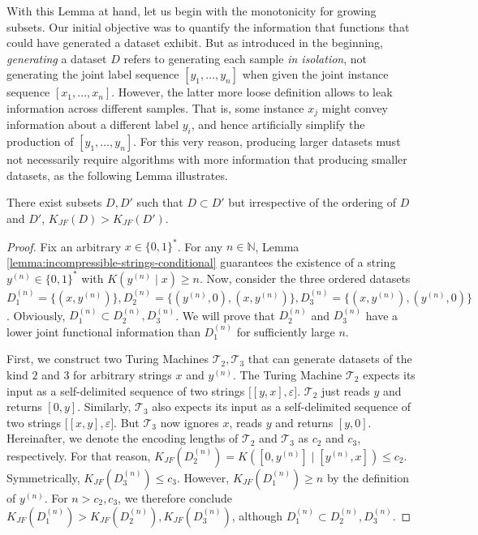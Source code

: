 With this Lemma at hand, let us begin with the monotonicity for growing subsets.
Our initial objective was to quantify the information that functions that could have generated a dataset exhibit.
But as introduced in the beginning, \textit{generating} a dataset $D$ refers to generating each sample \textit{in isolation}, not generating the joint label sequence $[y_1,\dots,y_n]$ when given the joint instance sequence $[x_1,\dots,x_n]$.
However, the latter more loose definition allows to leak information across different samples.
That is, some instance $x_j$ might convey information about a different label $y_i$, and hence artificially simplify the production of $[y_1,\dots,y_n]$.
For this very reason, producing larger datasets must not necessarily require algorithms with more information that producing smaller datasets, as the following Lemma illustrates.
\begin{lemma}
	There exist subsets $D,D'$ such that $D\subset D'$ but irrespective of the ordering of $D$ and $D'$, $K_{JF}(D)>K_{JF}(D')$.
\end{lemma}
\begin{proof}
	Fix an arbitrary $x\in\{0,1\}^{*}$.
	For any $n\in\mathbb{N}$, Lemma \ref{lemma:incompressible-strings-conditional} guarantees the existence of a string $y^{(n)}\in\{0,1\}^{*}$ with $K(y^{(n)}\mid x)\geq n$.
	Now, consider the three ordered datasets $D^{(n)}_1=\{(x,y^{(n)})\},D^{(n)}_2=\{(y^{(n)},0),(x,y^{(n)})\},D^{(n)}_3=\{(x,y^{(n)}),(y^{(n)},0)\}$.
	Obviously, $D^{(n)}_1\subset D^{(n)}_2, D^{(n)}_3$.
	We will prove that $D^{(n)}_2$ and $D^{(n)}_3$ have a lower joint functional information than $D^{(n)}_1$ for sufficiently large $n$.
	
	First, we construct two Turing Machines $\mathcal{T}_2,\mathcal{T}_3$ that can generate datasets of the kind $2$ and $3$ for arbitrary strings $x$ and $y^{(n)}$.
	The Turing Machine $\mathcal{T}_2$ expects its input as a self-delimited sequence of two strings $\bigl[[y,x],\varepsilon\bigr]$.
	$\mathcal{T}_2$ just reads $y$ and returns $[0,y]$.
	Similarly, $\mathcal{T}_3$ also expects its input as a self-delimited sequence of two strings $\bigl[[x,y],\varepsilon\bigr]$.
	But $\mathcal{T}_3$ now ignores $x$, reads $y$ and returns $[y,0]$.
	Hereinafter, we denote the encoding lengths of $\mathcal{T}_2$ and $\mathcal{T}_3$ as $c_2$ and $c_3$, respectively.
	For that reason, $K_{JF}(D^{(n)}_2)=K([0,y^{(n)}] \mid [y^{(n)},x])\leq c_2$. 
	Symmetrically, $K_{JF}(D^{(n)}_3)\leq c_3$.
	However, $K_{JF}(D^{(n)}_1)\geq n$ by the definition of $y^{(n)}$.
	For $n> c_2,c_3$, we therefore conclude $K_{JF}(D^{(n)}_1)>K_{JF}(D^{(n)}_2),K_{JF}(D^{(n)}_3)$, although $D^{(n)}_1\subset D^{(n)}_2,D^{(n)}_3$.
\end{proof}
